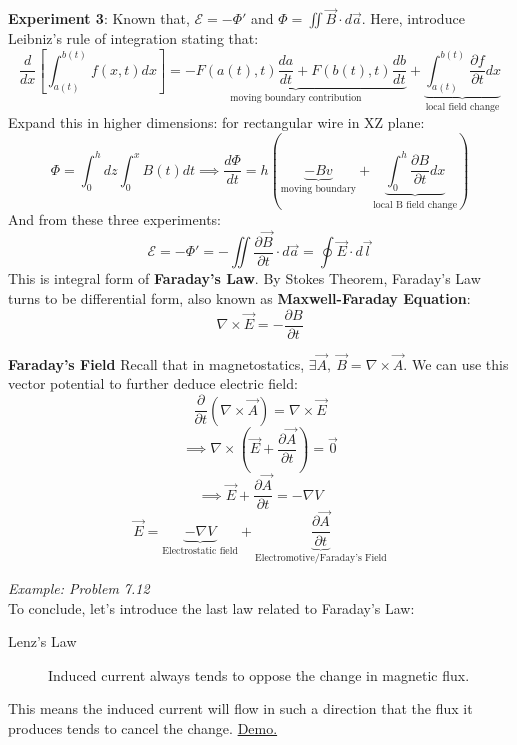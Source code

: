 \documentclass[12pt,a4paper,twoside]{article}
\numberwithin{equation}{section}
\begin{document}
\noindent \textbf{Experiment 3}: Known that, $\mathcal{E}=-\Phi'$ and $\Phi=\iint\overrightarrow{B}\cdot d\overrightarrow{a}$. Here, introduce Leibniz's rule of integration stating that:
\begin{equation}
    \frac{d}{dx}\left[\int_{a(t)}^{b(t)}f(x,t)dx\right] = \underbrace{-F(a(t), t)\frac{da}{dt}+F(b(t), t)\frac{db}{dt}}_{\text{moving boundary contribution}}+\underbrace{\int_{a(t)}^{b(t)}\frac{\partial f}{\partial t}dx}_{\text{local field change}}
\end{equation}
Expand this in higher dimensions: for rectangular wire in XZ plane:
\begin{equation*}
    \Phi=\int_0^h dz\int_0^xB(t) dt\implies \frac{d\Phi}{dt}=h(\underbrace{-Bv}_{\text{moving boundary}}+\underbrace{\int_{0}^{h}\frac{\partial B}{\partial t}dx}_{\text{local B field change}})
\end{equation*}
And from these three experiments:
\begin{equation}
    \boxed{
    \mathcal{E}=-\Phi'=-\iint\frac{\partial \overrightarrow{B}}{\partial t}\cdot d\overrightarrow{a}=\oint\overrightarrow{E}\cdot d\overrightarrow{l}
    }
    \label{eq: Faraday's law-integral}
\end{equation}
This is integral form of \textbf{Faraday's Law}. By Stokes Theorem, Faraday's Law turns to be differential form, also known as \textbf{Maxwell-Faraday Equation}:
\begin{equation}
    \boxed{
    \nabla\times \overrightarrow{E}= -\frac{\partial B}{\partial t}
    }
    \label{eq: Faraday's Law-derivative}
\end{equation}

\noindent \textbf{Faraday's Field} Recall that in magnetostatics, $\exists \overrightarrow{A},\ \overrightarrow{B}=\nabla\times \overrightarrow{A}$. We can use this vector potential to further deduce electric field:
\[\frac{\partial }{\partial t}(\nabla\times\overrightarrow{A})=\nabla \times \overrightarrow{E}\]
\[\implies \nabla\times\left(\overrightarrow{E}+\frac{\partial \overrightarrow{A}}{\partial t}\right)=\overrightarrow{0}\]
\[\implies \overrightarrow{E}+\frac{\partial \overrightarrow{A}}{\partial t}=-\nabla V\]
\[\overrightarrow{E}=\underbrace{-\nabla V}_{\text{Electrostatic field}}+\underbrace{\frac{\partial \overrightarrow{A}}{\partial t}}_{\text{Electromotive/Faraday's Field}}\]

\noindent \textit{Example: Problem 7.12}\\

\noindent To conclude, let's introduce the last law related to Faraday's Law:
\begin{description}
    \item[Lenz's Law] Induced current always tends to oppose the change in magnetic flux.
\end{description}
This means the induced current will flow in such a direction that the flux it produces tends to cancel the change. \href{https://www.youtube.com/watch?v=N7tIi71-AjA}{Demo.}
\end{document}
